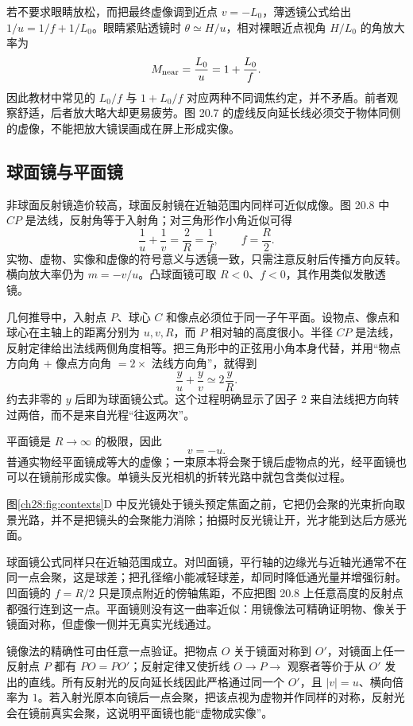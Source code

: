 若不要求眼睛放松，而把最终虚像调到近点 $v=-L_0$，薄透镜公式给出 $1/u=1/f+1/L_0$。眼睛紧贴透镜时 $\theta\simeq H/u$，相对裸眼近点视角 $H/L_0$ 的角放大率为
\[
 M_{\rm near}=\frac{L_0}{u}=1+\frac{L_0}{f}.
\]
因此教材中常见的 $L_0/f$ 与 $1+L_0/f$ 对应两种不同调焦约定，并不矛盾。前者观察舒适，后者放大略大却更易疲劳。图 20.7 的虚线反向延长线必须交于物体同侧的虚像，不能把放大镜误画成在屏上形成实像。

\MagnifierDiagram

\subsection*{球面镜与平面镜}

非球面反射镜造价较高，球面反射镜在近轴范围内同样可近似成像。图 20.8 中 $CP$ 是法线，反射角等于入射角；对三角形作小角近似可得
\begin{equation}
 \frac1u+\frac1v=\frac2R=\frac1f,\qquad f=\frac R2.
\end{equation}
实物、虚物、实像和虚像的符号意义与透镜一致，只需注意反射后传播方向反转。横向放大率仍为 $m=-v/u$。凸球面镜可取 $R<0$、$f<0$，其作用类似发散透镜。

几何推导中，入射点 $P$、球心 $C$ 和像点必须位于同一子午平面。设物点、像点和球心在主轴上的距离分别为 $u,v,R$，而 $P$ 相对轴的高度很小。半径 $CP$ 是法线，反射定律给出法线两侧角度相等。把三角形中的正弦用小角本身代替，并用“物点方向角 $+$ 像点方向角 $=2\times$ 法线方向角”，就得到
\[
 \frac yu+\frac yv\simeq2\frac yR.
\]
约去非零的 $y$ 后即为球面镜公式。这个过程明确显示了因子 $2$ 来自法线把方向转过两倍，而不是来自光程“往返两次”。

平面镜是 $R\to\infty$ 的极限，因此
\begin{equation}
 v=-u.
\end{equation}
普通实物经平面镜成等大的虚像；一束原本将会聚于镜后虚物点的光，经平面镜也可以在镜前形成实像。单镜头反光相机的折转光路中就包含类似过程。

图\ref{ch28:fig:contexts}D 中反光镜处于镜头预定焦面之前，它把仍会聚的光束折向取景光路，并不是把镜头的会聚能力消除；拍摄时反光镜让开，光才能到达后方感光面。

球面镜公式同样只在近轴范围成立。对凹面镜，平行轴的边缘光与近轴光通常不在同一点会聚，这是球差；把孔径缩小能减轻球差，却同时降低通光量并增强衍射。凹面镜的 $f=R/2$ 只是顶点附近的傍轴焦距，不应把图 20.8 上任意高度的反射点都强行连到这一点。平面镜则没有这一曲率近似：用镜像法可精确证明物、像关于镜面对称，但虚像一侧并无真实光线通过。

镜像法的精确性可由任意一点验证。把物点 $O$ 关于镜面对称到 $O'$，对镜面上任一反射点 $P$ 都有 $PO=PO'$；反射定律又使折线 $O\to P\to$ 观察者等价于从 $O'$ 发出的直线。所有反射光的反向延长线因此严格通过同一个 $O'$，且 $|v|=u$、横向倍率为 $1$。若入射光原本向镜后一点会聚，把该点视为虚物并作同样的对称，反射光会在镜前真实会聚，这说明平面镜也能“虚物成实像”。

